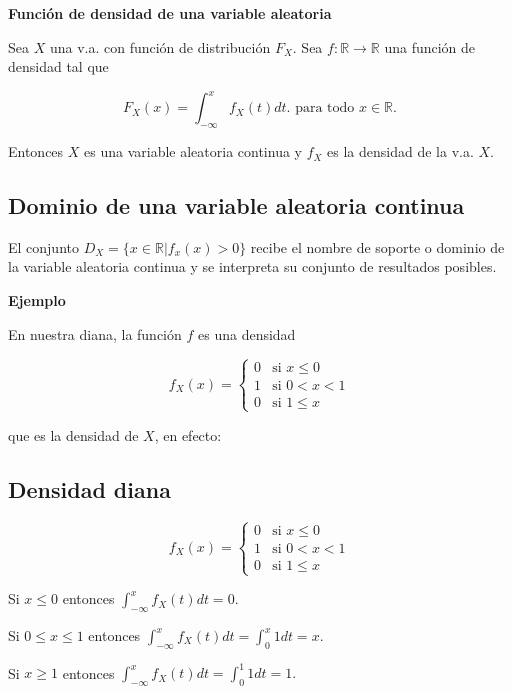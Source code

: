 \documentclass[]{book}
\begin{document}
 \textbf{Función de densidad de una variable aleatoria}

Sea \(X\) una v.a. con función de distribución \(F_X\). Sea \(f:\mathbb{R}\to\mathbb{R}\) una función de densidad tal que

\[F_X(x)=\displaystyle\int_{-\infty}^{x} f_X(t) dt.\mbox{ para todo } x\in\mathbb{R}.\]

Entonces \(X\) es una variable aleatoria continua y \(f_X\) es la densidad de la v.a. \(X\).

\hypertarget{dominio-de-una-variable-aleatoria-continua}{%
\subsection{Dominio de una variable aleatoria continua}\label{dominio-de-una-variable-aleatoria-continua}}

El conjunto \(D_X=\{x\in\mathbb{R}| f_x(x)>0\}\) recibe el nombre de soporte o dominio de la
variable aleatoria continua y se interpreta su conjunto de resultados posibles.

\textbf{Ejemplo}

En nuestra diana, la función \(f\) es una densidad

\[
f_{X}(x)=\left\{
\begin{array}{ll}
0 & \mbox{si } x\leq 0\\
1 & \mbox{si } 0 < x < 1\\
0 & \mbox{si } 1\leq x
\end{array}\right.
\]

que es la densidad de \(X\), en efecto:

\hypertarget{densidad-diana}{%
\subsection{Densidad diana}\label{densidad-diana}}

\[
f_{X}(x)=\left\{
\begin{array}{ll}
0 & \mbox{si } x\leq 0\\
1 & \mbox{si } 0 < x < 1\\
0 & \mbox{si } 1\leq x
\end{array}\right.
\]

Si \(x \leq 0\) entonces \(\displaystyle\int_{-\infty}^x f_X(t) dt = 0.\)

Si \(0\leq x\leq 1\) entonces \(\displaystyle\int_{-\infty}^x f_X(t) dt = \int_0^x 1 dt = x.\)

Si \(x\geq 1\) entonces \(\displaystyle\int_{-\infty}^x f_X(t) dt = \int_0^1 1 dt = 1.\)
\end{document}
